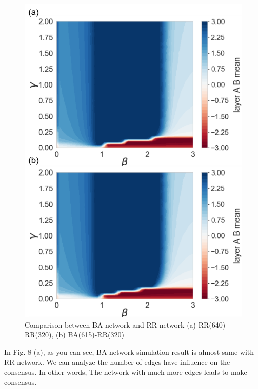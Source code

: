 \documentclass[english]{cccconf}
\begin{document}
\begin{figure}[!htb]
  \centering
  \includegraphics[width=\hsize]{FIG8.png}
  \caption{Comparison between BA network and RR network (a) RR(640)-RR(320), (b) BA(615)-RR(320)}
  \label{Fig8}
\end{figure}
In Fig. 8 (a), as you can see, BA network simulation result is almost same with RR network. We can analyze the number of edges have influence on the consensus. In other words, The network with much more edges leads to make consensus.  
\end{document}
